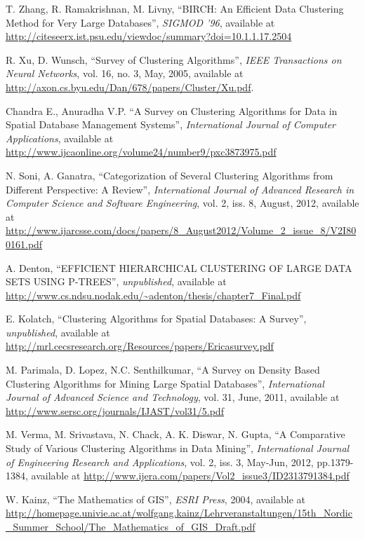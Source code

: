 \documentclass[conference, 10pt]{IEEEtran}
\begin{document}
  \newpage
  \begin{thebibliography}{1}


   T. Zhang, R. Ramakrishnan, M. Livny, ``BIRCH: An Efficient Data Clustering Method for Very Large Databases'', \emph{SIGMOD ’96}, available at
  \url{http://citeseerx.ist.psu.edu/viewdoc/summary?doi=10.1.1.17.2504}

   R. Xu, D. Wunsch, ``Survey of Clustering Algorithms'', \emph{IEEE Transactions on Neural Networks}, vol. 16, no. 3, May, 2005, available at 
  \url{http://axon.cs.byu.edu/Dan/678/papers/Cluster/Xu.pdf}.

   Chandra E., Anuradha V.P. ``A Survey on Clustering Algorithms for Data in Spatial Database Management Systems'', \emph{International Journal of Computer Applications}, available at
  \url{http://www.ijcaonline.org/volume24/number9/pxc3873975.pdf}

   N. Soni, A. Ganatra, ``Categorization of Several Clustering Algorithms from Different Perspective: A Review'', \emph{International Journal of Advanced Research in Computer Science and Software Engineering}, vol. 2, iss. 8, August, 2012, available at
  \url{http://www.ijarcsse.com/docs/papers/8_August2012/Volume_2_issue_8/V2I800161.pdf}

   A. Denton, ``EFFICIENT HIERARCHICAL CLUSTERING OF LARGE DATA SETS USING P-TREES'', \emph{unpublished}, available at
  \url{http://www.cs.ndsu.nodak.edu/~adenton/thesis/chapter7_Final.pdf}

   E. Kolatch, ``Clustering Algorithms for Spatial Databases: A Survey'', \emph{unpublished}, available at
  \url{http://mrl.cecsresearch.org/Resources/papers/Ericasurvey.pdf}

   M. Parimala, D. Lopez, N.C. Senthilkumar, ``A Survey on Density Based Clustering Algorithms for Mining Large Spatial Databases'', \emph{International Journal of Advanced Science and Technology}, vol. 31, June, 2011, available at
  \url{http://www.sersc.org/journals/IJAST/vol31/5.pdf}

   M. Verma, M. Srivastava, N. Chack, A. K. Diswar, N. Gupta, ``A Comparative Study of Various Clustering Algorithms in Data Mining'', \emph{International Journal of Engineering Research and Applications}, vol. 2, iss. 3, May-Jun, 2012, pp.1379-1384, available at
  \url{http://www.ijera.com/papers/Vol2_issue3/ID2313791384.pdf}

   W. Kainz, ``The Mathematics of GIS'', \emph{ESRI Press}, 2004, available at
  \url{http://homepage.univie.ac.at/wolfgang.kainz/Lehrveranstaltungen/15th_Nordic_Summer_School/The_Mathematics_of_GIS_Draft.pdf}


\end{thebibliography}
\end{document}
